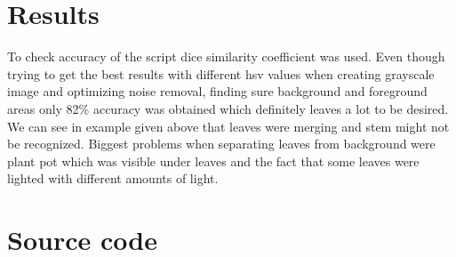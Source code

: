 \documentclass[10pt]{article}
\begin{document}
\section{Results}
To check accuracy of the script dice similarity coefficient was used. Even though trying to get the best results with different hsv values when creating grayscale image and optimizing noise removal, finding sure background and foreground areas only 82\% accuracy was obtained which definitely leaves a lot to be desired. We can see in example given above that leaves were merging and stem might not be recognized. Biggest problems when separating leaves from background were plant pot which was visible under leaves and the fact that some leaves were lighted with different amounts of light.
\clearpage
\section{Source code}
\end{document}
